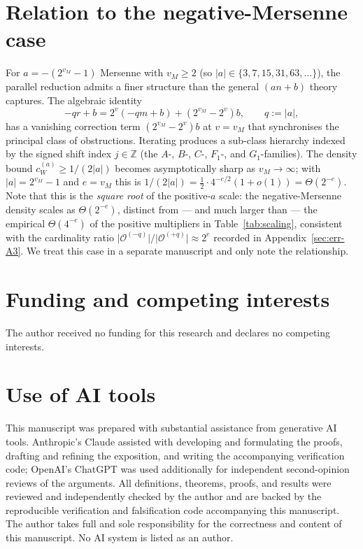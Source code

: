 \documentclass[11pt,reqno]{amsart}
\theoremstyle{plain}
\theoremstyle{definition}
\theoremstyle{remark}
\newcommand{\Z}{\mathbb{Z}}
\newcommand{\Obs}{\mathcal{O}}
\newcommand{\cWa}{c_{W}^{(a)}}
\begin{document}
\section{Relation to the negative-Mersenne case}\label{sec:neg-mersenne}

For $a = -(2^{v_M} - 1)$ Mersenne with $v_M \ge 2$ (so $\lvert a \rvert
\in \{3, 7, 15, 31, 63, \ldots\}$), the parallel reduction admits a
finer structure than the general $(an+b)$ theory captures. The
algebraic identity
\[
-q r + b = 2^v (-q m + b) + (2^{v_M} - 2^v) b, \qquad q := \lvert a \rvert,
\]
has a vanishing correction term $(2^{v_M} - 2^v) b$ at $v = v_M$ that
synchronises the principal class of obstructions. Iterating produces a
sub-class hierarchy indexed by the signed shift index $j \in \Z$ (the
$A$-, $B$-, $C$-, $F_1$-, and $G_1$-families). The density bound
$\cWa \ge 1/(2 \lvert a \rvert)$ becomes asymptotically sharp as
$v_M \to \infty$; with $\lvert a \rvert = 2^{v_M} - 1$ and $e = v_M$ this
is $1/(2 \lvert a \rvert) = \tfrac12 \cdot 4^{-e/2}(1 + o(1)) =
\Theta(2^{-e})$. Note that this is the \emph{square root} of the
positive-$a$ scale: the negative-Mersenne density scales as
$\Theta(2^{-e})$, distinct from --- and much larger than --- the empirical
$\Theta(4^{-e})$ of the positive multipliers in Table~\ref{tab:scaling},
consistent with the cardinality ratio
$\lvert \Obs^{(-q)} \rvert / \lvert \Obs^{(+q)} \rvert \approx 2^{e}$
recorded in Appendix~\ref{sec:err-A3}. We treat this case in a separate
manuscript and only note the relationship.

\section*{Funding and competing interests}

The author received no funding for this research and declares no competing
interests.

\section*{Use of AI tools}

This manuscript was prepared with substantial assistance from generative AI
tools. Anthropic's Claude assisted with developing and formulating the proofs,
drafting and refining the exposition, and writing the accompanying verification
code; OpenAI's ChatGPT was used additionally for independent second-opinion
reviews of the arguments. All definitions, theorems, proofs, and results were
reviewed and independently checked by the author and are backed by the
reproducible verification and falsification code accompanying this manuscript. The
author takes full and sole responsibility for the correctness and content of
this manuscript. No AI system is listed as an author.
\end{document}
